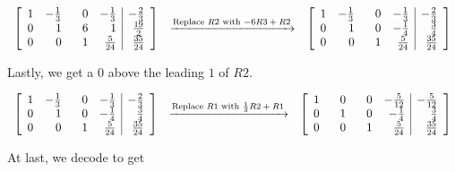 \documentclass{ximera}
\begin{document}
\begin{example}
\[\begin{array}{ccc}
 \left[ \begin{array}{rrrr|r}
 1 & -\frac{1}{3} & \hphantom{-}0 & -\frac{1}{3} & -\frac{2}{3} \\  
 0 & 1 & 6 & 1 & \frac{19}{2} \\  
 0 & 0& 1 & \frac{5}{24} & \frac{35}{24} \\  \end{array} \right]&

\xrightarrow{\text{Replace $R2$ with $-6R3+R2$}}

&

 \left[ \begin{array}{rrrr|r}
 1 & -\frac{1}{3} & \hphantom{-}0 & -\frac{1}{3} & -\frac{2}{3} \\  
 0 & 1 & 0 & -\frac{1}{4} & \frac{3}{4} \\  
 0 & 0& 1 & \frac{5}{24} & \frac{35}{24} \\  \end{array} \right]

 \end{array}\]

Lastly, we get a $0$ above the leading $1$ of $R2$.

\[ \begin{array}{ccc}

 \left[ \begin{array}{rrrr|r}
 1 & -\frac{1}{3} & \hphantom{-}0 & -\frac{1}{3} & -\frac{2}{3} \\  
 0 & 1 & 0 & -\frac{1}{4} & \frac{3}{4} \\  
 0 & 0& 1 & \frac{5}{24} & \frac{35}{24} \\  \end{array} \right]
 
 &

\xrightarrow{\text{Replace $R1$ with $\frac{1}{3}R2+R1$}}

&

 \left[ \begin{array}{rrrr|r}
 1 & \hphantom{-}0 & \hphantom{-}0 & -\frac{5}{12} & -\frac{5}{12} \\  
 0 & 1 & 0 & -\frac{1}{4} & \frac{3}{4} \\  
 0 & 0& 1 & \frac{5}{24} & \frac{35}{24} \\  \end{array} \right]

 \end{array}\]
 
 At last, we decode to get
 
 \[ \begin{array}{ccc}


\end{array}\]
\end{example}
\end{document}
